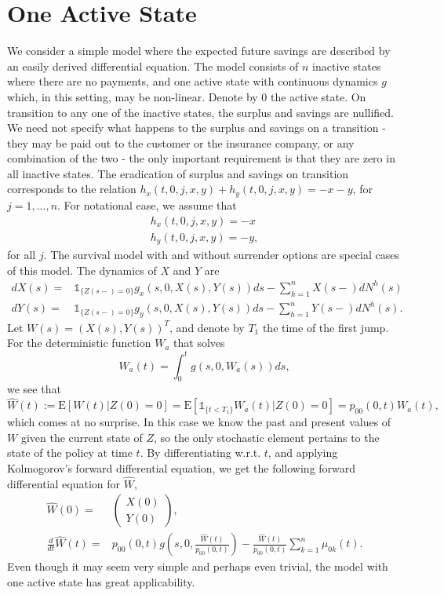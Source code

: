 \documentclass[12pt]{article}
\newcommand{\E}{\text{E}}
\newcommand{\indic}[1]{\mathds{1}_{ \{ #1 \} }}
\theoremstyle{my_thm}
\begin{document}
\section{One Active State}
We consider a simple model where the expected future savings are described by an easily derived differential equation. The model consists of $n$ inactive states where there are no payments, and one active state with continuous dynamics $g$ which, in this setting, may be non-linear. Denote by $0$ the active state. On transition to any one of the inactive states, the surplus and savings are nullified. We need not specify what happens to the surplus and savings on a transition - they may be paid out to the customer or the insurance company, or any combination of the two - the only important requirement is that they are zero in all inactive states. The eradication of surplus and savings on transition corresponds to the relation $h_x(t,0,j,x,y)+h_y(t,0,j,x,y)=-x-y$, for $j=1,...,n$. For notational ease, we assume that 
\begin{gather*}
h_x(t,0,j,x,y)=-x
\\
h_y(t,0,j,x,y)=-y,
\end{gather*}
for all $j$. The survival model with and without surrender options are special cases of this model.  The dynamics of $X$ and $Y$ are
\begin{align*}
dX(s)=& \indic{Z(s-)=0} g_x(s,0,X(s),Y(s))ds - \sum_{h=1}^n X(s-)dN^h(s)
\\
dY(s)=& \indic{Z(s-)=0} g_y(s,0,X(s),Y(s))ds - \sum_{h=1}^n Y(s-)dN^h(s).
\end{align*}
Let $W(s)=(X(s),Y(s))^T$, and denote by $T_1$ the time of the first jump. For the deterministic function $W_a$ that solves
$$
W_a(t)=\int_0^t g(s,0,W_a(s)) ds,
$$
we see that
$$
\hat{W}(t):=\E[W(t)|Z(0)=0] = \E [  \indic{t<T_1} W_a(t)|Z(0)=0]  = p_{00}(0,t) W_a(t),
$$
which comes at no surprise. In this case we know the past and present values of $W$ given the current state of $Z$, so the only stochastic element pertains to the state of the policy at time $t$. By differentiating w.r.t. $t$, and applying Kolmogorov's forward differential equation, we get the following forward differential equation for $\hat{W}$,
\begin{align*}
\hat{W}(0)=&\begin{pmatrix}
X(0)\\
Y(0)
\end{pmatrix},
\\
\frac{d}{dt}\hat{W}(t)=&p_{00}(0,t) g \left( s,0,\frac{\hat{W}(t)}{p_{00}(0,t)}\right)
-
\frac{\hat{W}(t)}{p_{00}(0,t)}\sum_{k=1}^n \mu_{0k}(t).
\end{align*}
Even though it may seem very simple and perhaps even trivial, the model with one active state has great applicability.
\end{document}

